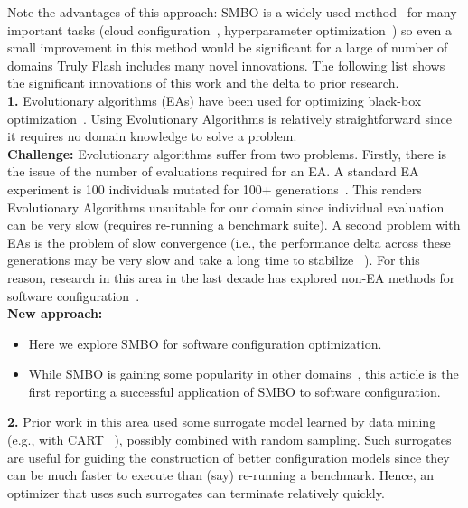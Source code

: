 \documentclass[10pt,journal,compsoc]{IEEEtran}
\newcommand{\bi}{\begin{itemize}}
\newcommand{\ei}{\end{itemize}}
\newcommand{\flash}{{\sc Flash}\xspace}
\begin{document}


Note the advantages of this approach:
SMBO is a widely used method~\cite{hoffman2014modular}  for many important tasks (cloud configuration~\cite{alipourfard2017cherrypick}, hyperparameter optimization~\cite{bergstra2011algorithms}) so even a small improvement in this method would be significant for a large of number of domains
Truly \flash includes many novel innovations. The following list shows the significant innovations of this work and the delta to prior research.  \\
\textbf{1.} Evolutionary algorithms (EAs) have been used for optimizing black-box optimization~\cite{harman2009search}. Using Evolutionary Algorithms is relatively straightforward since it requires no domain knowledge to solve a problem.\\
\noindent\textbf{Challenge:} Evolutionary algorithms suffer from two problems.
Firstly, there is the issue of
the number of evaluations required for an EA. A standard EA experiment is 100 individuals mutated for 100+ generations~\cite{sarro2016multi}. This renders Evolutionary Algorithms unsuitable for  our domain since individual evaluation can be very slow (requires re-running a benchmark suite).
A second problem with EAs is the problem of slow convergence (i.e., the performance delta across these generations may be very slow and take a long time to stabilize ~\cite{chen2017beyond}).
For this reason, research in this area in the last decade has explored non-EA methods for software configuration~\cite{siegmund2012predicting, guo2013variability, sarkar2015cost, nair17, nair2017using}.\\
\noindent\textbf{New approach:} 
\bi
\item
Here we explore SMBO for software configuration optimization. 
\item
 While SMBO is gaining some popularity in other domains~\cite{alipourfard2017cherrypick, golovin2017google, shahriari2016taking },  this article is the first reporting a successful application of SMBO to software configuration.
\ei
\textbf{2.} Prior work in this area used some surrogate model learned by data mining (e.g., with CART ~\cite{guo2013variability, sarkar2015cost, nair17}),   possibly combined with random sampling. Such surrogates are useful for guiding the construction of better configuration models since they can be much faster to execute than (say) re-running a benchmark. Hence, an optimizer that uses such surrogates can terminate relatively quickly.\\
\end{document}
